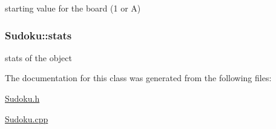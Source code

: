 starting value for the board (1 or A) \hypertarget{classSudoku_a4e3db7bee575395d9336b78963b8d426}{
\subsubsection[{stats}]{ Sudoku\-::stats\hspace{0.3cm}{\ttfamily [private]}}}\label{classSudoku_a4e3db7bee575395d9336b78963b8d426}
stats of the object 

The documentation for this class was generated from the following files\-:\begin{DoxyCompactItemize}
\item 
\hyperlink{Sudoku_8h}{Sudoku.\-h}\item 
\hyperlink{Sudoku_8cpp}{Sudoku.\-cpp}\end{DoxyCompactItemize}
